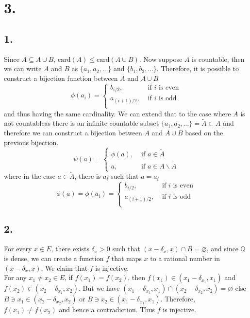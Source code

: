 \documentclass[11pt]{article}
\theoremstyle{mystyle}
\theoremstyle{definition}
\begin{document}
\section*{3.}
\subsection*{1.}
Since $A \subseteq A \cup B$, $\text{card} (A) \le \text{card}(A \cup B)$. Now suppose $A$ is countable, then we can write $A$ and $B$ as $\{a_1, a_2, \hdots\}$ and $\{b_1, b_2, \hdots\}$. Therefore, it is possible to construct a bijection function between $A$ and $A\cup B$
\[
  \phi(a_i) = 
  \begin{cases}
    b_{i/2}, & \text{ if } i \text{ is even} \\ 
    a_{(i+1)/2}, & \text{ if } i \text{ is odd} \\ 
  \end{cases}
\]
and thus having the same cardinality. We can extend that to the case where $A$ is not countableas there is an infinite countable subset $\{a_1, a_2, \hdots \} = \tilde{A} \subset A$ and therefore we can construct a bijection between $A$ and $A \cup B$ based on the previous bijection.
\[
  \psi(a) = 
  \begin{cases}
    \phi(a), & \text{ if } a \in \tilde{A} \\
    a, & \text{ if } a \in A \backslash \tilde{A}
  \end{cases}
\]
where in the case $a \in \tilde{A}$, there is $a_i$ such that $a = a_i$
\[
  \phi(a) = \phi(a_i) = \begin{cases}
    b_{i/2}, & \text{ if } i \text{ is even} \\ 
    a_{(i+1)/2}, & \text{ if } i \text{ is odd} \\ 
  \end{cases}
\]
\subsection*{2.}
For every $x \in E$, there exists $\delta_x > 0 $ such that $(x-\delta_x, x) \cap B = \varnothing$, and since $\mathbb{Q}$ is dense, 
we can create a function $f$ that maps $x$ to a rational number in $(x-\delta_x, x)$. We claim that $f$ is injective. \\
For any $x_1 \ne x_2 \in E$, if $f(x_1) = f(x_2)$, then $f(x_1) \in (x_1-\delta_{x_1}, x_1)$ and $f(x_2) \in (x_2 - \delta_{x_2}, x_2)$. 
But we have $(x_1 - \delta_{x_1}, x_1) \cap (x_2 - \delta_{x_2}, x_2) = \varnothing$ else $B \ni x_1 \in (x_2 - \delta_{x_2}, x_2)$ or $B \ni x_2 \in (x_1 - \delta_{x_1}, x_1)$. Therefore, $f(x_1) \ne f(x_2)$ and hence a contradiction. 
Thus $f$ is injective.
\newpage
\end{document}
